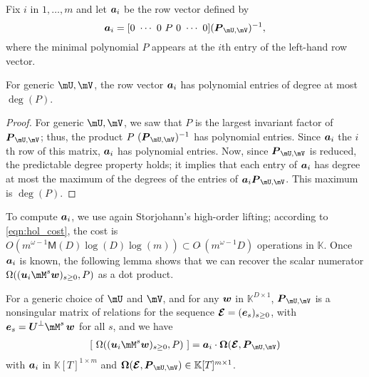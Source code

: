 \documentclass[12pt]{article}
\newcommand{\var}{T} %
\newcommand{\mat}[1]{\bm{\MakeUppercase{#1}}} %
\newcommand{\row}[1]{\bm{\MakeLowercase{#1}}} %
\newcommand{\col}[1]{\bm{\MakeLowercase{#1}}} %
\newcommand{\softO}[1]{O{\tilde{~}}(#1)} %
\newcommand{\minpoly}{P}
\def\M {\ensuremath{\mathsf{M}}}
\def\K{\mathbb{K}}
\def\K {\ensuremath{\mathbb{K}}}
\begin{document}
Fix $i$ in $1,\dots,m$ and let $\row{a}_i$ be the row vector defined
by $$\row{a}_i =[0~\cdots~0~\minpoly~0~\cdots~0]  (\mat{P}_{\mU,\mV})^{-1} ,$$
where the minimal polynomial $\minpoly$ appears at the $i$th entry  of the
left-hand row vector. 
\begin{lemma}\label{utilde}
  For generic $\mU,\mV$, the row vector $\row{a}_i$ has polynomial
  entries of degree at most~$\deg(P)$.
\end{lemma}
\begin{proof}
  For generic $\mU,\mV$, we saw that $\minpoly$ is the largest invariant factor
  of $ \mat{P}_{\mU,\mV}$; thus, the product $\minpoly\
  (\mat{P}_{\mU,\mV})^{-1}$ has polynomial entries. Since $\row{a}_i$ the $i$th
  row of this matrix, $\row{a}_i$ has polynomial entries.  Now, since
  $\mat{P}_{\mU,\mV}$ is reduced, the predictable degree property
  \cite[Theorem~6.3-13]{Kailath80} holds; it implies that each entry of
  $\row{a}_i$ has degree at most the maximum of the degrees of the entries of
  $\row{a}_i\mat{P}_{\mU,\mV}$. This maximum is $\deg(\minpoly)$.
\end{proof}
To compute $\row{a}_i$, we use again Storjohann's high-order lifting;
according to \cref{eqn:hol_cost}, the cost is $ O(m^{\omega-1} \M(D)
\log(D) \log(m)) \subset \softO{m^{\omega-1}D}$ operations in $\K$.
Once $\row{a}_i$ is known, the following lemma shows that we can
recover the scalar numerator $\Omega((\row{u}_i \mM^s \col{w})_{s \ge
  0}, \minpoly)$ as a dot product.
\begin{lemma}\label{lemma:omegaOmega}
  For a generic choice of $\mU$ and $\mV$, and for any $\col{w}$ in
  $\K^{D \times 1}$, $ \mat{P}_{\mU,\mV}$ is a nonsingular matrix of
  relations for the sequence $\mat{\mathcal{E}} =
  (\col{e}_s)_{s\ge0}$, with $\col{e}_s=\mat{U}^\perp \mM^s\, \col{w}$
  for all $s$, and we have
\begin{align}\label{eq:OmegaOmega}
[~\Omega((\row{u}_i \mM^s \col{w})_{s \ge 0}, \minpoly)~] = \row{a}_i\cdot \mat{\Omega}(\mat{\mathcal{E}}, \mat{P}_{\mU,\mV})
\end{align}
with $\row{a}_i$ in $\K[\var]^{1 \times m}$ and 
$\mat{\Omega}(\mat{\mathcal{E}} , \mat{P}_{\mU,\mV}) \in \K[\var]^{m \times 1}$.
\end{lemma}
\end{document}
